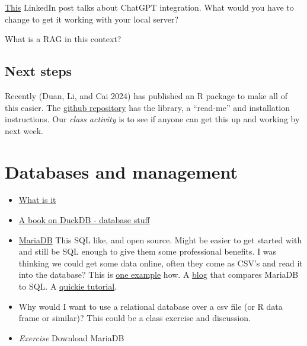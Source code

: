\documentclass[
  letterpaper,
  DIV=11,
  numbers=noendperiod]{scrreprt}
\providecommand{\tightlist}{%
  \setlength{\itemsep}{0pt}\setlength{\parskip}{0pt}}\usepackage{longtable,booktabs,array}
\begin{document}
\href{https://www.linkedin.com/pulse/integrate-chatgpt-openai-api-your-research-project-part-ding-wang-rdyec}{This}
LinkedIn post talks about ChatGPT integration. What would you have to
change to get it working with your local server?

\begin{tcolorbox}[enhanced jigsaw, opacityback=0, leftrule=.75mm, colback=white, left=2mm, titlerule=0mm, toprule=.15mm, toptitle=1mm, coltitle=black, title=\textcolor{quarto-callout-tip-color}{\faLightbulb}\hspace{0.5em}{Class Question}, opacitybacktitle=0.6, colbacktitle=quarto-callout-tip-color!10!white, breakable, bottomrule=.15mm, bottomtitle=1mm, colframe=quarto-callout-tip-color-frame, arc=.35mm, rightrule=.15mm]

What is a RAG in this context?

\end{tcolorbox}

\section{Next steps}\label{next-steps}

Recently (Duan, Li, and Cai 2024) has published an R package to make all
of this easier. The
\href{https://github.com/xufengduan/MacBehaviour}{github repository} has
the library, a ``read-me'' and installation instructions. Our
\emph{class activity} is to see if anyone can get this up and working by
next week.


\chapter{Databases and management}\label{databases-and-management}

\begin{itemize}
\tightlist
\item
  \href{https://www.dataversity.net/what-is-database-management/}{What
  is it}
\item
  \href{https://learning-oreilly-com.proxy.lib.uwaterloo.ca/library/view/getting-started-with/9781803241005/B18270_01.xhtml\#_idTextAnchor015}{A
  book on DuckDB - database stuff}
\item
  \href{https://mariadb.org/}{MariaDB} This SQL like, and open source.
  Might be easier to get started with and still be SQL enough to give
  them some professional benefits. I was thinking we could get some data
  online, often they come as CSV's and read it into the database? This
  is \href{https://www.simplified.guide/mysql-mariadb/import-csv}{one
  example} how. A
  \href{https://kinsta.com/blog/mariadb-vs-postgresql/}{blog} that
  compares MariaDB to SQL. A
  \href{https://mariadb.com/kb/en/mariadb-basics/}{quickie tutorial}.
\item
  Why would I want to use a relational database over a csv file (or R
  data frame or similar)? This could be a class exercise and discussion.
\item
  \emph{Exercise} Download MariaDB
\end{itemize}
\end{document}

